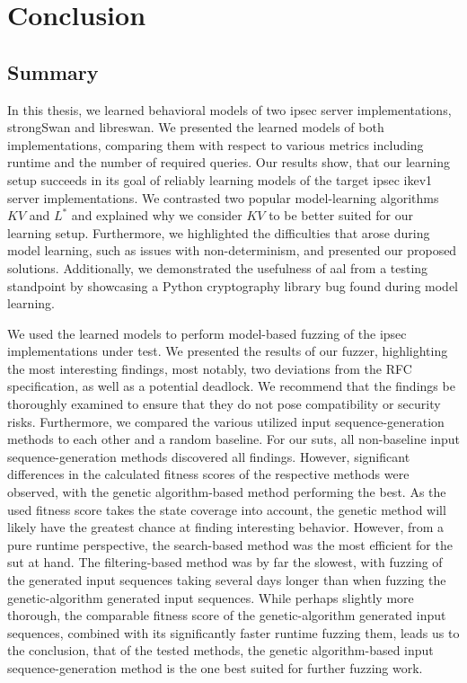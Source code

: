\chapter{Conclusion} \label{chap:Conclusion}

\section{Summary}
In this thesis, we learned behavioral models of two \ac{ipsec} server implementations, strongSwan and libreswan. We presented the learned models of both implementations, comparing them with respect to various metrics including runtime and the number of required queries. Our results show, that our learning setup succeeds in its goal of reliably learning models of the target \ac{ipsec} \ac{ike}v1 server implementations. We contrasted two popular model-learning algorithms $KV$ and $L^*$ and explained why we consider $KV$ to be better suited for our learning setup. Furthermore, we highlighted the difficulties that arose during model learning, such as issues with non-determinism, and presented our proposed solutions. Additionally, we demonstrated the usefulness of \ac{aal} from a testing standpoint by showcasing a Python cryptography library bug found during model learning. 

We used the learned models to perform model-based fuzzing of the \ac{ipsec} implementations under test. We presented the results of our fuzzer, highlighting the most interesting findings, most notably, two deviations from the RFC specification, as well as a potential deadlock. We recommend that the findings be thoroughly examined to ensure that they do not pose compatibility or security risks. Furthermore, we compared the various utilized input sequence-generation methods to each other and a random baseline. For our \acp{sut}, all non-baseline input sequence-generation methods discovered all findings. However, significant differences in the calculated fitness scores of the respective methods were observed, with the genetic algorithm-based method performing the best. As the used fitness score takes the state coverage into account, the genetic method will likely have the greatest chance at finding interesting behavior. However, from a pure runtime perspective, the search-based method was the most efficient for the \ac{sut} at hand. The filtering-based method was by far the slowest, with fuzzing of the generated input sequences taking several days longer than when fuzzing the genetic-algorithm generated input sequences. While perhaps slightly more thorough, the comparable fitness score of the genetic-algorithm generated input sequences, combined with its significantly faster runtime fuzzing them, leads us to the conclusion, that of the tested methods, the genetic algorithm-based input sequence-generation method is the one best suited for further fuzzing work.

